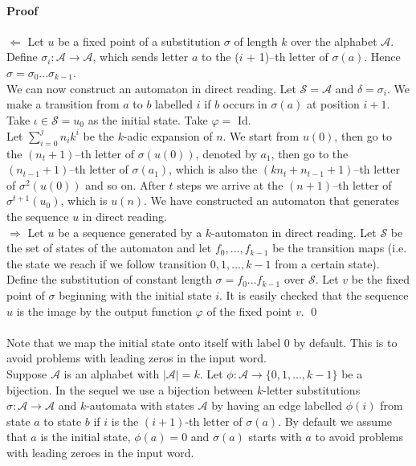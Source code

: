 \documentclass{article}
\begin{document}
\paragraph{Proof}
$\Leftarrow$ Let $u$ be a fixed point of a substitution $\sigma$ of length
$k$ over the alphabet $\mathcal{A}$. Define
$\sigma_i: \mathcal{A} \rightarrow \mathcal{A}$, which sends letter $a$ to the
($i$ + 1)--th letter of $\sigma(a)$. Hence
$\sigma = \sigma_0 ... \sigma_{k - 1}$.\\
We can now construct an automaton in direct reading. Let $\mathcal{S = A}$ and
$\delta = \sigma_i$. We make a transition from $a$ to $b$ labelled $i$ if $b$
occurs in $\sigma(a)$ at position $i + 1$. Take $\iota \in \mathcal{S} = u_0$
as the initial state. Take $\varphi =$ Id.\\
Let $\sum_{i = 0}^j n_i k^i$ be the $k$-adic expansion of $n$. We start from 
$u(0)$, then go to the $(n_t + 1)$--th letter of $\sigma(u(0))$, denoted by 
$a_1$, then go to the $(n_{t - 1} + 1)$--th letter of $\sigma(a_1)$, which is 
also the $(kn_t + n_{t - 1} + 1)$--th letter of $\sigma^2(u(0))$ and so on.
After $t$ steps we arrive at the $(n + 1)$--th letter of $\sigma^{t + 1}(u_0)$,
which is $u(n)$. We have constructed an automaton that generates the sequence 
$u$ in direct reading.\\
$\Rightarrow$ Let $u$ be a sequence generated by a $k$-automaton in direct
reading. Let $\mathcal{S}$ be the set of states of the automaton and let
$f_0, ..., f_{k - 1}$ be the transition maps (i.e. the state we reach if we
follow transition $0, 1, ..., k - 1$ from a certain state). Define the 
substitution of constant length $\sigma = f_0 ... f_{k - 1}$ over 
$\mathcal{S}$. Let $v$ be the fixed point of $\sigma$ beginning with the 
initial state $i$. It is easily checked that the sequence $u$ is the image by 
the output function $\varphi$ of the fixed point $v$. \qed\\
\\
Note that we map the initial state onto itself with label 0 by default. This
is to avoid problems with leading zeros in the input word.\\
Suppose $\mathcal{A}$ is an alphabet with $|\mathcal{A}| = k$. Let 
$\phi: \mathcal{A} \rightarrow \{0, 1, ..., k - 1\}$ be a bijection. In the
sequel we use a bijection between $k$-letter substitutions 
$\sigma: \mathcal{A} \rightarrow \mathcal{A}$ and $k$-automata with states 
$\mathcal{A}$ by having an edge labelled $\phi(i)$ from state $a$ to state $b$ 
if $i$ is the $(i + 1)$-th letter of $\sigma(a)$. By default we assume that
$a$ is the initial state, $\phi(a) = 0$ and $\sigma(a)$ starts with $a$ to 
avoid problems with leading zeroes in the input word.
\end{document}
